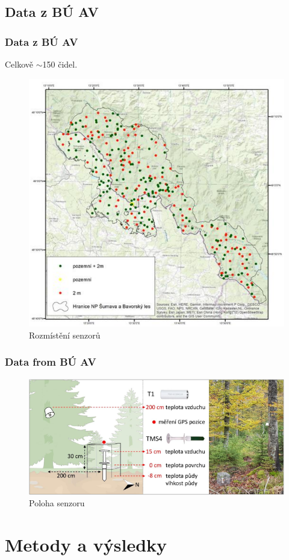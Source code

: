 \documentclass[
	11pt, %
]{beamer}
\begin{document}
\subsection{Data z BÚ AV}

\begin{frame}
	\frametitle{Data z BÚ AV}
	Celkově $\sim$150 čidel.
	\begin{figure}
		\includegraphics[width=0.7\linewidth]{forest_sensors.png}
		\caption{Rozmístění senzorů}
	\end{figure}
\end{frame}

\begin{frame}
	\frametitle{Data from BÚ AV}
	\begin{figure}
		\includegraphics[width=0.8\linewidth]{sensor_closeup.png}
		\caption{Poloha senzoru}
	\end{figure}
\end{frame}




\section{Metody a výsledky}
\end{document}
